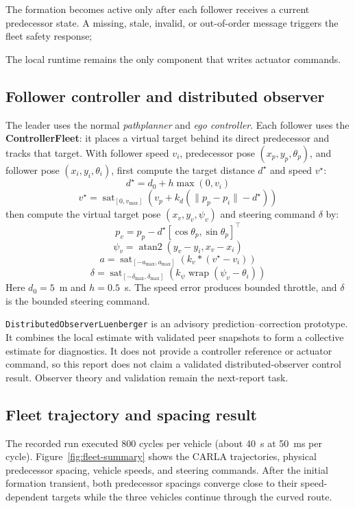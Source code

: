 \documentclass[11pt,a4paper]{article}
\begin{document}
The formation becomes active only after each follower receives a current predecessor state. A missing, stale, invalid, or out-of-order message triggers the fleet safety response; 

The local runtime remains the only component that writes actuator commands.

\subsection{Follower controller and distributed observer}
The leader uses the normal {\it pathplanner} and {\it ego controller}. Each follower uses the \textbf{ControllerFleet}: it places a virtual target behind its direct predecessor and tracks that target. With follower speed $v_i$, predecessor pose $(x_p,y_p,\theta_p)$, and follower pose $(x_i,y_i,\theta_i)$, first compute the target distance $d^\star$ and speed $v^\star$:
\[d^\star=d_0+h\max(0,v_i)\]
\[v^\star=\operatorname{sat}_{[0,v_{\max}]}\!\left(v_p+k_d(\lVert p_p-p_i\rVert-d^\star)\right)\]
then compute the virtual target pose $(x_v,y_v,\psi_v)$ and steering command $\delta$ by:
\[p_v=p_p-d^\star[\cos\theta_p,\sin\theta_p]^\top\]
\[\psi_v=\operatorname{atan2}(y_v-y_i,x_v-x_i)\]
\[a =  \operatorname{sat}_{[-a_{\max},a_{\max}]}\!\left(k_v * (v^\star - v_i)\right)\]
\[\delta=\operatorname{sat}_{[-\delta_{\max},\delta_{\max}]}\!\left(k_\psi\operatorname{wrap}(\psi_v-\theta_i)\right)\]
Here $d_0=5$~m and $h=0.5$~s. The speed error produces bounded throttle, and $\delta$ is the bounded steering command.

\texttt{DistributedObserverLuenberger} is an advisory prediction--correction prototype. It combines the local estimate with validated peer snapshots to form a collective estimate for diagnostics. It does not provide a controller reference or actuator command, so this report does not claim a validated distributed-observer control result. Observer theory and validation remain the next-report task.

\subsection{Fleet trajectory and spacing result}
The recorded run executed 800 cycles per vehicle (about 40~s at 50~ms per cycle). Figure~\ref{fig:fleet-summary} shows the CARLA trajectories, physical predecessor spacing, vehicle speeds, and steering commands. After the initial formation transient, both predecessor spacings converge close to their speed-dependent targets while the three vehicles continue through the curved route.
\end{document}
